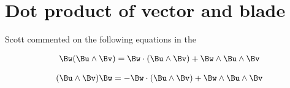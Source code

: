 

\chapter{Dot product of vector and blade}
\label{chap:dotBlade}
{}
\date{Aug 11, 2009}

\beginArtWithToc

Scott commented on the following equations in the 

\begin{align*}
\Bw (\Bu \wedge \Bv) = \Bw \cdot (\Bu \wedge \Bv) + \Bw \wedge \Bu \wedge \Bv
\end{align*}

\begin{align*}
(\Bu \wedge \Bv) \Bw = - \Bw \cdot (\Bu \wedge \Bv) + \Bw \wedge \Bu \wedge \Bv
\end{align*}

\EndNoBibArticle
